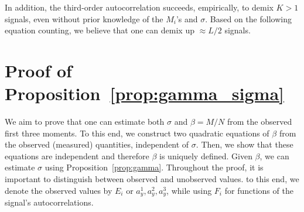 \documentclass[english,11pt]{article}
\newcommand{\TODO}[1]{{\color{red}{[#1]}}}
\numberwithin{equation}{section}
\theoremstyle{plain}
\theoremstyle{definition}
\theoremstyle{remark}
\theoremstyle{plain}
\theoremstyle{remark}
\theoremstyle{plain}
\theoremstyle{plain}
\begin{document}
In addition, the  third-order autocorrelation succeeds, empirically, to demix  $K>1$ signals, even without prior knowledge of the $M_i$'s and $\sigma$. Based on the following equation counting, we believe that one can demix up $\approx L/2$ signals. 
\TODO{Here we can add the equations counting argument. Do we want to consider also conjecture on the computational limit?}



\section{Proof of Proposition~\ref{prop:gamma_sigma}} \label{sec:proof_prop_gamma_sigma}

We aim to prove that one can estimate both $\sigma$ and $\beta = M/N$ from the observed first three moments.
To this end, we construct two quadratic equations of $\beta$ from the observed (measured) quantities, independent of $\sigma$.
Then, we show that these equations are independent and therefore $\beta$ is uniquely defined. 
Given $\beta$, we can estimate $\sigma$ using Proposition~\ref{prop:gamma}.
Throughout the proof, it is important to distinguish between observed and unobserved values. 
to this end, we denote the observed values by $E_i$ or $a_y^1,a_y^2,a_y^3$, while using $F_i$ for functions of the signal's autocorrelations. 
\end{document}
